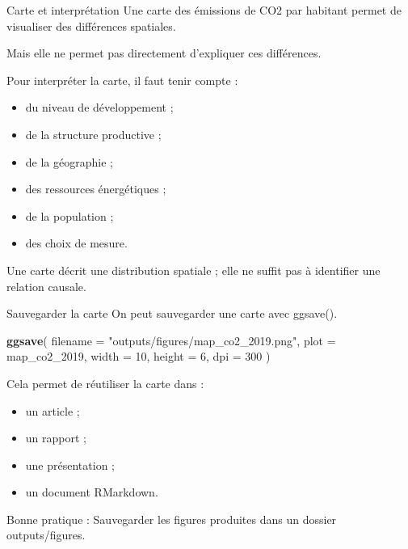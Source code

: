 \documentclass[
  10pt,
  ignorenonframetext,
]{beamer}
\newenvironment{Shaded}{\begin{snugshade}}{\end{snugshade}}
\newcommand{\AttributeTok}[1]{\textcolor[rgb]{0.13,0.29,0.53}{#1}}
\newcommand{\DecValTok}[1]{\textcolor[rgb]{0.00,0.00,0.81}{#1}}
\newcommand{\FunctionTok}[1]{\textcolor[rgb]{0.13,0.29,0.53}{\textbf{#1}}}
\newcommand{\NormalTok}[1]{#1}
\newcommand{\StringTok}[1]{\textcolor[rgb]{0.31,0.60,0.02}{#1}}
\begin{document}
\begin{frame}{Carte et interprétation}
\label{carte-et-interpruxe9tation}
Une carte des émissions de CO2 par habitant permet de visualiser des
différences spatiales.

Mais elle ne permet pas directement d'expliquer ces différences.

Pour interpréter la carte, il faut tenir compte :

\begin{itemize}
  \item du niveau de développement ;
  \item de la structure productive ;
  \item de la géographie ;
  \item des ressources énergétiques ;
  \item de la population ;
  \item des choix de mesure.
\end{itemize}

Une carte décrit une distribution spatiale ; elle ne suffit pas à
identifier une relation causale.
\end{frame}

\begin{frame}[fragile]{Sauvegarder la carte}
\label{sauvegarder-la-carte}
On peut sauvegarder une carte avec ggsave().

\begin{Shaded}
\begin{Highlighting}[]
\FunctionTok{ggsave}\NormalTok{(}
  \AttributeTok{filename =} \StringTok{"outputs/figures/map\_co2\_2019.png"}\NormalTok{,}
  \AttributeTok{plot =}\NormalTok{ map\_co2\_2019,}
  \AttributeTok{width =} \DecValTok{10}\NormalTok{,}
  \AttributeTok{height =} \DecValTok{6}\NormalTok{,}
  \AttributeTok{dpi =} \DecValTok{300}
\NormalTok{)}
\end{Highlighting}
\end{Shaded}

Cela permet de réutiliser la carte dans :

\begin{itemize}
\item un article ;
\item un rapport ;
\item une présentation ;
\item un document RMarkdown.
\end{itemize}

Bonne pratique : Sauvegarder les figures produites dans un dossier
outputs/figures.
\end{frame}
\end{document}
